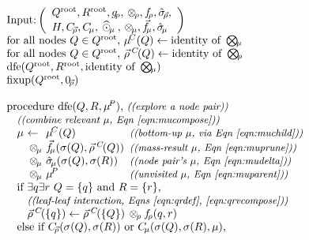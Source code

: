 \documentclass[twoside,leqno,twocolumn]{article}
\newcommand{\com}[1]{{\small \textit{((#1))}}}
\newcommand{\summary}{\hat{\sigma}}
\newcommand{\psty}{}
\newcommand{\X}{\\ \psty}
\newcommand{\x}{\X \hspace{0.13in}}
\newcommand{\xx}{\X \hspace{0.26in}}
\newcommand{\kdroot}[1]{#1^{\text{root}}}
\newcommand{\nameOp}[2]{\mathop{#1\nolimits\!\!_{#2}}}
\newcommand{\nameop}[2]{{\scriptstyle\:}#1_{\!#2}}
\newcommand{\myOp}[1]{\nameOp{\bigotimes}{#1}}
\newcommand{\myop}[1]{\nameop{\otimes}{#1}}
\newcommand{\letterqr}{\rho}
\newcommand{\Opqr}{\myOp{\letterqr}}
\newcommand{\opqr}{\myop{\letterqr}}
\newcommand{\fqr}{f_{\!\letterqr}}
\newcommand{\gqr}{g_{\!\letterqr}}
\newcommand{\letterqrv}{\vec{\rho}}
\newcommand{\deltaqrv}{\summary_{\!\letterqrv}}
\newcommand{\canpruneqrv}{C_{\!\letterqrv}}
\newcommand{\identqr}{0_{\!\letterqrv}}
\newcommand{\varqrv}{\letterqrv^{\:C\!}}
\newcommand{\lettermu}{\mu}
\newcommand{\inmu}{\mu}
\newcommand{\outopmu}{\:\widehat{\odot}_{\!\mu}\:}
\newcommand{\Opmu}{\myOp{\lettermu}}
\newcommand{\opmu}{\myop{\lettermu}}
\newcommand{\fmuv}{\vec{f_{\!\lettermu}}}
\newcommand{\deltamu}{\summary_{\!\lettermu}}
\newcommand{\canprunemu}{C_{\!\lettermu}}
\newcommand{\heurqr}{H}
\newcommand{\varmuchild}{\lettermu^{\!C}}
\newcommand{\varmuparent}{\lettermu^{\!P}}
\newcommand{\outstat}{\sigma}
\begin{document}
\begin{figure}
\[
  \begin{array}[t]{l}
    \\ \text{Input:}\left(
        \begin{array}[c]{l}\kdroot{Q}, \kdroot{R}, \gqr, \opqr, \fqr, \deltaqrv, \\ \heurqr, \canpruneqrv, \canprunemu, \outopmu, \opmu, \fmuv, \deltamu\end{array}\right)
    \X \text{for all nodes } Q \in \kdroot{Q}\text{, } \varmuchild(Q) \gets \text{identity of }\Opmu
    \X \text{for all nodes } Q \in \kdroot{Q}\text{, } \varqrv(Q) \gets \text{identity of }\Opqr%
    \X \text{dfe}(\kdroot{Q}, \kdroot{R}, \text{identity of }\Opmu)
    \X \text{fixup}(\kdroot{Q}, \identqr)
    \X
    \X \text{procedure dfe}(Q, R, \varmuparent)\text{, \com{explore a node pair}}
    \x \text{\com{combine relevant $\lettermu$, Eqn~\ref{eqn:mucompose}}}
    \x \!\!\!\begin{array}{llll}
         \psty\lettermu &\psty\!\!\!\!\gets\!\!\!\!& \psty\varmuchild(Q)                     & \!\!\!\text{\com{bottom-up $\lettermu$, via Eqn~\ref{eqn:muchild}}}
         \\             &\psty\!\!\!\!\opmu\!\!\!\!& \psty\fmuv(\outstat(Q), \varqrv(Q))     & \!\!\!\text{\com{mass-result $\lettermu$, Eqn~\ref{eqn:muprune}}}
         \\             &\psty\!\!\!\!\opmu\!\!\!\!& \psty\deltamu(\outstat(Q), \outstat(R)) & \!\!\!\text{\com{node pair's $\lettermu$, Eqn~\ref{eqn:mudelta}}}
         \\             &\psty\!\!\!\!\opmu\!\!\!\!& \psty\varmuparent                       & \!\!\!\text{\com{unvisited $\lettermu$, Eqn~\ref{eqn:muparent}}}
       \end{array}
    \x \text{if } \exists q \exists r ~ Q = \{q\}\text{ and }R = \{r\}\text{,}
    \xx \text{\com{leaf-leaf interaction, Eqns \ref{eqn:qrdef}, \ref{eqn:qrvcompose}}}
    \xx \varqrv(\{q\}) \gets \varqrv(\{Q\}) \opqr \fqr(q, r)
    \x \text{else if } \canpruneqrv(\outstat(Q), \outstat(R))\text{ or }\canprunemu(\outstat(Q), \outstat(R), \lettermu)\text{,}

\end{array}\]
\end{figure}
\end{document}
